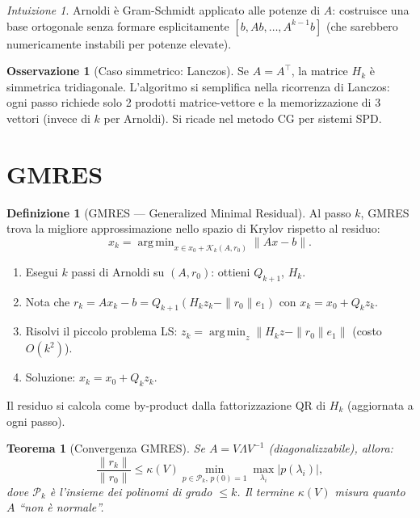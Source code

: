 \documentclass[11pt, a4paper, twoside]{book}
\theoremstyle{definition}
\newtheorem{defn}{Definizione}[chapter]
\newtheorem{remark}{Osservazione}[chapter]
\theoremstyle{plain}
\newtheorem{thm}{Teorema}[chapter]
\theoremstyle{remark}
\newtheorem{intuition}{Intuizione}[chapter]
\DeclareMathOperator*{\argmin}{arg\,min}
\begin{document}
\begin{intuition}
Arnoldi è Gram-Schmidt applicato alle potenze di $A$: costruisce una base ortogonale senza formare esplicitamente $[b, Ab, \ldots, A^{k-1}b]$ (che sarebbero numericamente instabili per potenze elevate).
\end{intuition}

\begin{remark}[Caso simmetrico: Lanczos]
Se $A = A^\top$, la matrice $H_k$ è simmetrica tridiagonale. L'algoritmo si semplifica nella ricorrenza di Lanczos: ogni passo richiede solo 2 prodotti matrice-vettore e la memorizzazione di 3 vettori (invece di $k$ per Arnoldi). Si ricade nel metodo CG per sistemi SPD.
\end{remark}

\section{GMRES}
\label{sec:gmres}

\begin{defn}[GMRES — Generalized Minimal Residual]
Al passo $k$, GMRES trova la migliore approssimazione nello spazio di Krylov rispetto al residuo:
\[
  x_k = \argmin_{x \in x_0 + \mathcal{K}_k(A, r_0)} \|Ax - b\|.
\]
\end{defn}

\begin{algobox}[GMRES]
\begin{enumerate}
  \item Esegui $k$ passi di Arnoldi su $(A, r_0)$: ottieni $Q_{k+1}$, $H_k$.
  \item Nota che $r_k = Ax_k - b = Q_{k+1}(H_k z_k - \|r_0\|e_1)$ con $x_k = x_0 + Q_k z_k$.
  \item Risolvi il piccolo problema LS: $z_k = \argmin_z \|H_k z - \|r_0\|e_1\|$ (costo $O(k^2)$).
  \item Soluzione: $x_k = x_0 + Q_k z_k$.
\end{enumerate}
Il residuo si calcola come by-product dalla fattorizzazione QR di $H_k$ (aggiornata a ogni passo).
\end{algobox}

\begin{thm}[Convergenza GMRES]
Se $A = V\Lambda V^{-1}$ (diagonalizzabile), allora:
\[
  \frac{\|r_k\|}{\|r_0\|} \leq \kappa(V) \min_{p \in \mathcal{P}_k,\, p(0)=1} \max_{\lambda_i} |p(\lambda_i)|,
\]
dove $\mathcal{P}_k$ è l'insieme dei polinomi di grado $\leq k$. Il termine $\kappa(V)$ misura quanto $A$ ``non è normale''.
\end{thm}
\end{document}

